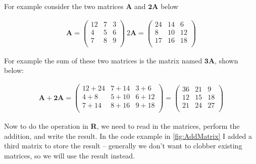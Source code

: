 For example consider the two matrices $\mathbf{A}$ and $\mathbf{2A}$ below


\begin{gather}
\mathbf{A}=
\begin{pmatrix}
12 & 7 & 3 \\
4 & 5 &6 \\
7 & 8 & 9 \\
\end{pmatrix}
~ 
2\mathbf{A}=
\begin{pmatrix}
24 & 14 & 6\\
8 & 10 & 12 \\
17 & 16 & 18 \\
\end{pmatrix}
\end{gather}

For example the sum of these two matrices is the matrix named $\mathbf{3A}$,  shown below:

\begin{gather}
\mathbf{A+2A}=
\begin{pmatrix}
12+24 & 7+14 & 3+6 \\
4+8 & 5+10 & 6+12 \\
7+14 & 8+16 & 9+18 \\
\end{pmatrix}
=
\begin{pmatrix}
36 &  21 &   9 \\
12  & 15 &  18 \\
21  & 24 &  27 \\
\end{pmatrix}
\end{gather}

Now to do the operation in \textbf{R}, we need to read in the matrices, perform the addition, and write the result.  
In the code example in \ref{fig:AddMatrix} I added a third matrix to store the result -- generally we don't want to clobber existing matrices, so we will use the result instead.   

